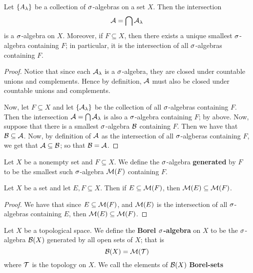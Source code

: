 \begin{lemma}\label{8.1.3}
    Let $\{A_\lambda\}$ be a collection of $\sigma$-algebras on a set  $X$. Then the
    intersection
    \begin{equation*}
        \mathcal{A}=\bigcap{\mathcal{A}_\lambda}
    \end{equation*}
    is a $\sigma$-algebra on $X$. Moreover, if $F \subseteq X$, then there exists a
    unique smallest $\sigma$-algebra containing $F$; in particular, it is the
    intersection of all  $\sigma$-algebras containing  $F$.
\end{lemma}
\begin{proof}
    Notice that since each $\mathcal{A}_\lambda$ is a  $\sigma$-algebra, they are closed under
    countable unions and complements. Hence by definition,  $\mathcal{A}$ must also be
    closed under countable unions and complements.

    Now, let $F \subseteq X$ and let $\{\mathcal{A}_\lambda\}$ be the collection of all
    $\sigma$-algebras containing $F$. Then the intersection $\mathcal{A}=\bigcap{\mathcal{A}_\lambda}$ is
    also a $\sigma$-algebra containing  $F$; by above. Now, suppose that there is a
    smallest $\sigma$-algebra $\mathcal{B}$ containing $F$. Then we have that $\mathcal{B} \subseteq
    \mathcal{A}$. Now, by definition of  $\mathcal{A}$ as the intersection of all  $\sigma$-algberas
    containing  $F$, we get that  $\mathcal{A} \subseteq \mathcal{B}$; so that $\mathcal{B}=\mathcal{A}$.
\end{proof}

\begin{definition}
    Let $X$ be a nonempty set and  $F \subseteq X$. We define the $\sigma$-algebra
    \textbf{generated} by $F$ to be the smallest such $\sigma$-algebra $\mathcal{M}(F)$
    containing $F$.
\end{definition}

\begin{lemma}\label{8.1.4}
    Let $X$ be a set and let $E,F \subseteq X$. Then if $E \subseteq \mathcal{M}(F)$,
    then $\mathcal{M}(E) \subseteq \mathcal{M}(F)$.
\end{lemma}
\begin{proof}
    We have that since $E \subseteq \mathcal{M}(F)$, and $\mathcal{M}(E)$ is the intersection of
    all $\sigma$-algebras containing  $E$, then  $\mathcal{M}(E) \subseteq \mathcal{M}(F)$.
\end{proof}

\begin{definition}
    Let $X$ be a topological space. We define the  \textbf{Borel $\sigma$-algebra}
    on $X$ to be the  $\sigma$-algebra  $\mathcal{B}(X)$ generated by all open sets of $X$;
    that is
    \begin{equation*}
        \mathcal{B}(X)=\mathcal{M}(\mathcal{T})
    \end{equation*}
    where $\mathcal{T}$ is the topology on $X$. We call the elements of $\mathcal{B}(X)$
    \textbf{Borel-sets}
\end{definition}

